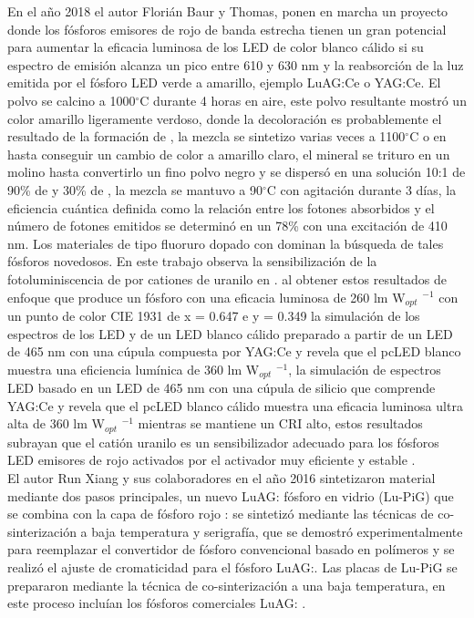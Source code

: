 En el año 2018 el autor Florián Baur y Thomas, ponen en marcha un proyecto
donde los fósforos emisores de rojo de banda estrecha tienen un gran potencial
para aumentar la eficacia luminosa de los LED de color blanco cálido si su
espectro de emisión alcanza un pico entre 610 y 630 nm y la reabsorción de la
luz emitida por el fósforo LED verde a amarillo, ejemplo LuAG:Ce o YAG:Ce. El
polvo se calcino a 1000$^{\circ}$C durante 4 horas en aire, este polvo resultante mostró
un color amarillo ligeramente verdoso, donde la decoloración es probablemente
el resultado de la formación de , la mezcla se sintetizo varias
veces a 1100$^{\circ}$C o en  hasta conseguir un cambio de color a amarillo
claro, el mineral se trituro en un molino hasta convertirlo un fino polvo negro
y se dispersó en una solución 10:1 de 90\% de   y 30\% de  ,
la mezcla se mantuvo a 90$^{\circ}$C con agitación durante 3 días, la eficiencia
cuántica definida como la relación entre los fotones absorbidos y el número de
fotones emitidos se determinó en un 78\% con una excitación de 410 nm. Los
materiales de tipo fluoruro dopado con  dominan la búsqueda de
tales fósforos novedosos. En este trabajo observa la sensibilización de la
fotoluminiscencia de  por cationes de uranilo en
. al obtener estos resultados de enfoque que produce un
fósforo con una eficacia luminosa de 260 lm W$_{opt}$ $^{-1}$ con un punto de
color CIE 1931 de x = 0.647 e y = 0.349 la simulación de los espectros de los
LED y de un LED blanco cálido preparado a partir de un LED de 465 nm con una
cúpula compuesta por YAG:Ce y  revela que el pcLED blanco
muestra una eficiencia lumínica  de 360 lm W$_{opt}$ $^{-1}$, la simulación de
espectros LED basado en un LED de 465 nm con una cúpula de silicio que
comprende YAG:Ce y  revela que el pcLED blanco cálido
muestra una eficacia luminosa ultra alta de 360 lm W$_{opt}$ $^{-1}$
mientras se mantiene un CRI alto, estos resultados subrayan que el catión
uranilo es un sensibilizador adecuado para los fósforos LED emisores de rojo
activados por el activador muy eficiente y estable
\cite{Baur2018,LiuFlux}.\\

El autor Run Xiang y sus colaboradores en el año 2016 sintetizaron material
mediante dos pasos principales, un nuevo LuAG: fósforo en vidrio
(Lu-PiG) que se combina con la capa de fósforo rojo :
se sintetizó mediante las técnicas de co-sinterización a baja temperatura y
serigrafía, que se demostró experimentalmente para reemplazar el convertidor de
fósforo convencional basado en polímeros y se realizó el ajuste de cromaticidad
para el fósforo LuAG:. Las placas de Lu-PiG se prepararon mediante
la técnica de co-sinterización a una baja temperatura, en este proceso incluían
los fósforos comerciales LuAG: \cite{Han2019,Peng2020}.\\

